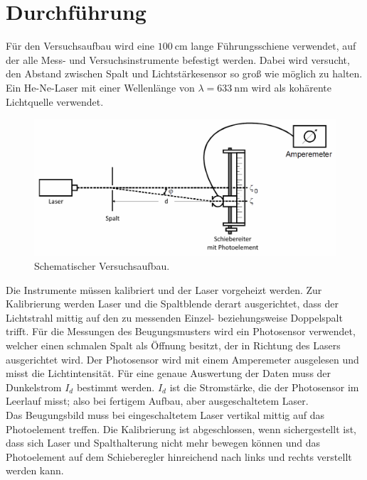 \section{Durchführung}
\label{sec:Durchführung}

Für den Versuchsaufbau wird eine $\SI{100}{\centi\meter}$ lange Führungsschiene verwendet, auf der alle Mess- und Versuchsinstrumente befestigt werden.
Dabei wird versucht, den Abstand zwischen Spalt und Lichtstärkesensor so groß wie möglich zu halten.
Ein He-Ne-Laser mit einer Wellenlänge von $\lambda = \SI{633}{\nano\meter}$ wird als kohärente Lichtquelle verwendet.

\begin{figure}
    \centering
    \includegraphics[width=\textwidth]{plots/Versuchsaufbau.png}
    \caption{Schematischer Versuchsaufbau.\protect\footnotemark}
    \label{fig:schemAufbau}
\end{figure}

\FloatBarrier

Die Instrumente müssen kalibriert und der Laser vorgeheizt werden.
Zur Kalibrierung werden Laser und die Spaltblende derart ausgerichtet, dass der Lichtstrahl mittig auf den zu messenden Einzel- beziehungsweise Doppelspalt trifft.
Für die Messungen des Beugungsmusters wird ein Photosensor verwendet, welcher einen schmalen Spalt als Öffnung besitzt, der in Richtung des Lasers ausgerichtet wird.
Der Photosensor wird mit einem Amperemeter ausgelesen und misst die Lichtintensität. Für eine genaue Auswertung der Daten muss der Dunkelstrom $I_d$ bestimmt werden.
$I_d$ ist die Stromstärke, die der Photosensor im Leerlauf misst; also bei fertigem Aufbau, aber ausgeschaltetem Laser.\\
Das Beugungsbild muss bei eingeschaltetem Laser vertikal mittig auf das Photoelement treffen.
Die Kalibrierung ist abgeschlossen, wenn sichergestellt ist, dass sich Laser und Spalthalterung nicht mehr bewegen können und das Photoelement auf dem Schieberegler hinreichend nach links
und rechts verstellt werden kann.\\

